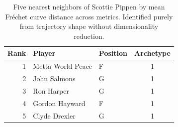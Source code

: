 \begin{table}[htbp]
  \centering\small
  \begin{tabular}{rllc}
    \toprule
    Rank & Player & Position & Archetype \\
    \midrule
    1 & Metta World Peace & F & 1 \\
    2 & John Salmons & G & 1 \\
    3 & Ron Harper & G & 1 \\
    4 & Gordon Hayward & F & 1 \\
    5 & Clyde Drexler & G & 1 \\
    \bottomrule
  \end{tabular}
  \caption{Five nearest neighbors of Scottie Pippen by mean Fr\'{e}chet curve distance across metrics. Identified purely from trajectory shape without dimensionality reduction.}
  \label{tab:Scottie_Pippen_frechet_curve_neighbors}
\end{table}

